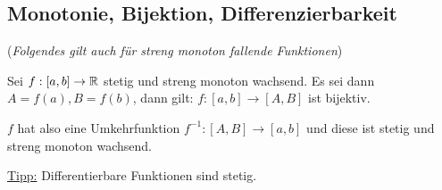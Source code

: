 \subsection{Monotonie, Bijektion, Differenzierbarkeit}
\begin{satz}
(\textit{Folgendes gilt auch für streng monoton fallende Funktionen})

Sei $f: [a, b] \to \mathbb{R}$ stetig und streng monoton wachsend. Es sei dann
$A = f(a), B = f(b)$, dann gilt: $f: [a,b] \to [A, B]$ ist bijektiv.

$f$ hat also eine Umkehrfunktion $f^{-1}: [A,B] \to [a,b]$ und diese ist stetig
und streng monoton wachsend.
\end{satz}

\underline{Tipp:} Differentierbare Funktionen sind stetig.
